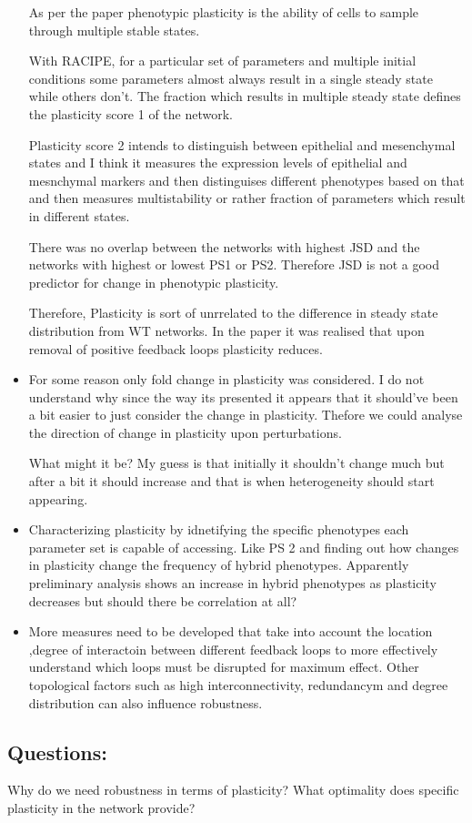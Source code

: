 \documentclass{article}
\begin{document}
\begin{itemize}
As per the paper phenotypic plasticity is the ability of cells to sample through multiple stable states. 

With RACIPE, for a particular set of parameters and multiple initial conditions some parameters almost always result in a single steady state while others don't. The fraction which results in multiple steady state defines the plasticity score 1 of the network.

Plasticity score 2 intends to distinguish between epithelial and mesenchymal states and I think it measures the expression levels of epithelial and mesnchymal markers and then distinguises different phenotypes based on that and then measures multistability or rather fraction of parameters which result in different states. 

There was no overlap between the networks with highest JSD and the networks with highest or lowest PS1 or PS2. Therefore JSD is not a good predictor for change in phenotypic plasticity. 

Therefore, Plasticity is sort of unrrelated to the difference in steady state distribution from WT networks. In the paper it was realised that upon removal of positive feedback loops plasticity reduces. 


\item For some reason only fold change in plasticity was considered. I do not understand why since the way its presented it appears that it should've been a bit easier to just consider the change in plasticity. Thefore we could analyse the direction of change in plasticity upon perturbations. 

	What might it be? My guess is that initially it shouldn't change much but after a bit it should increase and that is when heterogeneity should start appearing.


\item Characterizing plasticity by idnetifying the specific phenotypes each parameter set is capable of accessing. Like PS 2 and finding out how changes in plasticity change the frequency of hybrid phenotypes. Apparently preliminary analysis shows an increase in hybrid phenotypes as plasticity decreases but should there be correlation at all? 

\item More measures need to be developed that take into account the location ,degree of interactoin between different feedback loops to more effectively understand which loops must be disrupted for maximum effect. Other topological factors such as high interconnectivity, redundancym and degree distribution can also influence robustness. 

\end{itemize}

\subsection{Questions:}
Why do we need robustness in terms of plasticity? What optimality does specific plasticity in the network provide?
\end{document}
